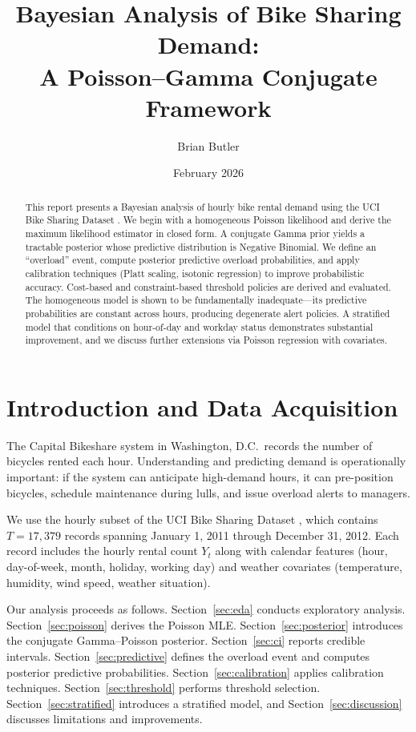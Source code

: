 \documentclass[12pt]{article}
\title{Bayesian Analysis of Bike Sharing Demand:\\
A Poisson--Gamma Conjugate Framework}
\author{Brian Butler}
\date{February 2026}
\begin{document}
\maketitle

\begin{abstract}
This report presents a Bayesian analysis of hourly bike rental demand
using the UCI Bike Sharing Dataset \citep{fanaee2013}.  We begin with
a homogeneous Poisson likelihood and derive the maximum likelihood
estimator in closed form.  A conjugate Gamma prior yields a tractable
posterior whose predictive distribution is Negative Binomial.  We
define an ``overload'' event, compute posterior predictive overload
probabilities, and apply calibration techniques (Platt scaling,
isotonic regression) to improve probabilistic accuracy.  Cost-based
and constraint-based threshold policies are derived and evaluated.
The homogeneous model is shown to be fundamentally inadequate---its
predictive probabilities are constant across hours, producing
degenerate alert policies.  A stratified model that conditions on
hour-of-day and workday status demonstrates substantial improvement,
and we discuss further extensions via Poisson regression with
covariates.
\end{abstract}

\section{Introduction and Data Acquisition}
\label{sec:intro}

The Capital Bikeshare system in Washington, D.C.\ records the number
of bicycles rented each hour.  Understanding and predicting demand is
operationally important: if the system can anticipate high-demand
hours, it can pre-position bicycles, schedule maintenance during
lulls, and issue overload alerts to managers.

We use the hourly subset of the UCI Bike Sharing Dataset
\citep{fanaee2013}, which contains $T = 17{,}379$ records spanning
January 1, 2011 through December 31, 2012.  Each record includes the
hourly rental count $Y_t$ along with calendar features
(hour, day-of-week, month, holiday, working day) and weather
covariates (temperature, humidity, wind speed, weather situation).

Our analysis proceeds as follows.  Section~\ref{sec:eda} conducts
exploratory analysis.  Section~\ref{sec:poisson} derives the Poisson
MLE.  Section~\ref{sec:posterior} introduces the conjugate
Gamma--Poisson posterior.  Section~\ref{sec:ci} reports credible
intervals.  Section~\ref{sec:predictive} defines the overload event
and computes posterior predictive probabilities.
Section~\ref{sec:calibration} applies calibration techniques.
Section~\ref{sec:threshold} performs threshold selection.
Section~\ref{sec:stratified} introduces a stratified model, and
Section~\ref{sec:discussion} discusses limitations and improvements.
\end{document}
